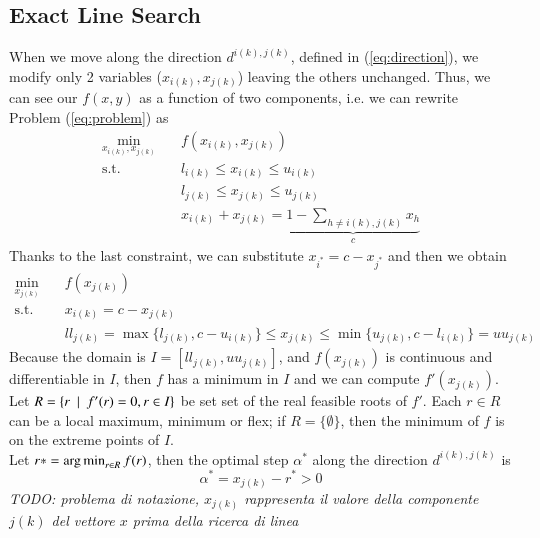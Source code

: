 \subsection{Exact Line Search}
When we move along the direction $d^{i(k),j(k)}$, defined in (\ref{eq:direction}), we modify only 2 variables ($x_{i(k)}, x_{j(k)}$) leaving the others unchanged. Thus, we can see our $f(x,y)$ as a function of two components, i.e. we can rewrite Problem (\ref{eq:problem}) as
\begin{subequations}\label{eq:twocomp} 
\begin{align}
\min_{x_{i(k)}, x_{j(k)}} & \quad f(x_{i(k)}, x_{j(k)})  \\
\text{s.t.} & \quad l_{i(k)} \leq x_{i(k)}  \leq u_{i(k)} \\
& \quad l_{j(k)} \leq x_{j(k)}  \leq u_{j(k)} \\
& \quad x_{i(k)}+x_{j(k)} = \underbrace{1-\sum_{h\ne {i(k)},{j(k)}}x_h}_c
\end{align}
\end{subequations}
Thanks to the last constraint, we can substitute $x_{i^*} = c - x_{j^*}$ and then we obtain
\begin{subequations}\label{eq:onecomp} 
\begin{align}
\min_{ x_{j(k)}} & \quad f(x_{j(k)}) \\
\text{s.t.} & \quad x_{i(k)} = c - x_{j(k)} \\
& \quad ll_{j(k)} = \max\{l_{j(k)}, c - u_{i(k)}\} \leq x_{j(k)} \leq \min \{ u_{j(k)}, c-l_{i(k)}\} = uu_{j(k)}
\end{align}
\end{subequations}
Because the domain is $I=[ll_{j(k)}, uu_{j(k)}]$, and $f(x_{j(k)})$ is continuous and differentiable in $I$, then $f$ has a minimum in $I$ and we can compute $f'(x_{j(k)})$. Let $R = \{ r \enskip | \enskip f'(r) = 0, r \in I \}$ be set set of the real feasible roots of $f'$. Each $r \in R$ can be a local maximum, minimum or flex; if $R = \{ \emptyset \}$, then the minimum of $f$ is on the extreme points of $I$.\\ 
Let $r* = \operatorname*{arg\,min}_{r \in R} f(r)$, then the optimal step $\alpha^*$ along the direction $d^{i(k),j(k)}$ is
\begin{equation}
\alpha^* = x_{j(k)} - r^* > 0
\end{equation} 
\textit{TODO: problema di notazione, $x_{j(k)}$ rappresenta il valore della componente $j(k)$ del vettore $x$ prima della ricerca di linea}
